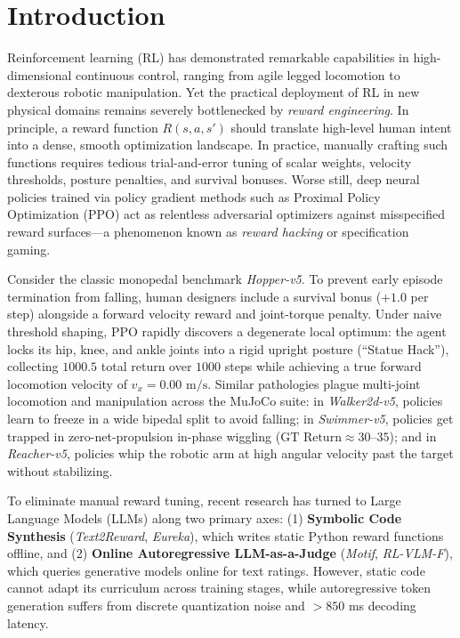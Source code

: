 \documentclass[10pt]{article}
\begin{document}
\section{Introduction}
Reinforcement learning (RL) has demonstrated remarkable capabilities in high-dimensional continuous control, ranging from agile legged locomotion to dexterous robotic manipulation. Yet the practical deployment of RL in new physical domains remains severely bottlenecked by \textit{reward engineering}. In principle, a reward function $R(s, a, s')$ should translate high-level human intent into a dense, smooth optimization landscape. In practice, manually crafting such functions requires tedious trial-and-error tuning of scalar weights, velocity thresholds, posture penalties, and survival bonuses. Worse still, deep neural policies trained via policy gradient methods such as Proximal Policy Optimization (PPO) act as relentless adversarial optimizers against misspecified reward surfaces---a phenomenon known as \textit{reward hacking} or specification gaming.

Consider the classic monopedal benchmark \textit{Hopper-v5}. To prevent early episode termination from falling, human designers include a survival bonus ($+1.0$ per step) alongside a forward velocity reward and joint-torque penalty. Under naive threshold shaping, PPO rapidly discovers a degenerate local optimum: the agent locks its hip, knee, and ankle joints into a rigid upright posture (``Statue Hack''), collecting $1000.5$ total return over $1000$ steps while achieving a true forward locomotion velocity of $v_x = 0.00\text{ m/s}$. Similar pathologies plague multi-joint locomotion and manipulation across the MuJoCo suite: in \textit{Walker2d-v5}, policies learn to freeze in a wide bipedal split to avoid falling; in \textit{Swimmer-v5}, policies get trapped in zero-net-propulsion in-phase wiggling ($\text{GT Return} \approx 30\text{--}35$); and in \textit{Reacher-v5}, policies whip the robotic arm at high angular velocity past the target without stabilizing.

To eliminate manual reward tuning, recent research has turned to Large Language Models (LLMs) along two primary axes: (1) \textbf{Symbolic Code Synthesis} (\textit{Text2Reward}, \textit{Eureka}), which writes static Python reward functions offline, and (2) \textbf{Online Autoregressive LLM-as-a-Judge} (\textit{Motif}, \textit{RL-VLM-F}), which queries generative models online for text ratings. However, static code cannot adapt its curriculum across training stages, while autoregressive token generation suffers from discrete quantization noise and $>850$ ms decoding latency.
\end{document}
